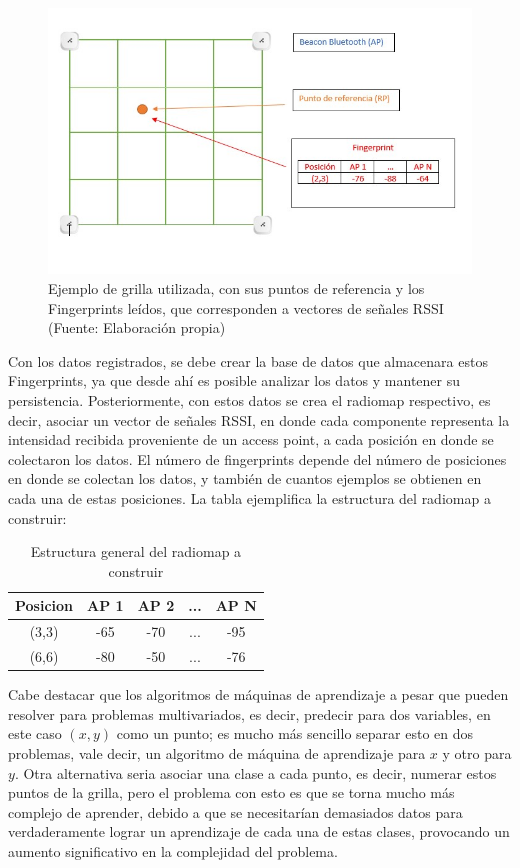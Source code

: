 \begin{figure}[ht!]
\centering
\includegraphics[width=.6\textwidth]{figures/fingerprints.jpg}
\caption[Ejemplo grilla Fingerprint]{Ejemplo de grilla utilizada, con sus puntos de referencia y los Fingerprints leídos, que corresponden a vectores de señales RSSI\\
{\scriptsize (Fuente: Elaboración propia)}}
\label{fig:fingerprints}
\end{figure}

Con los datos registrados, se debe crear la base de datos que almacenara estos Fingerprints, ya que desde ahí es posible analizar los datos y mantener su persistencia. Posteriormente, con estos datos se crea el radiomap respectivo, es decir, asociar un vector de señales RSSI, en donde cada componente representa la intensidad recibida proveniente de un access point, a cada posición en donde se colectaron los datos. El número de fingerprints depende del número de posiciones en donde se colectan los datos, y también de cuantos ejemplos se obtienen en cada una de estas posiciones. La tabla ejemplifica la estructura del radiomap a construir:

\begin{table}[ht!]
\centering
\caption{Estructura general del radiomap a construir}
\label{my-label}
\begin{tabular}{|c|c|c|c|c|}
\hline
Posicion & AP 1 & AP 2 & ... & AP N \\ \hline
(3,3)    & -65  & -70  & ... & -95  \\ \hline
(6,6)    & -80  & -50  & ... & -76  \\ \hline
\end{tabular}
\end{table}

Cabe destacar que los algoritmos de máquinas de aprendizaje a pesar que pueden resolver para problemas multivariados, es decir, predecir para dos variables, en este caso $(x,y)$ como un punto; es mucho más sencillo separar esto en dos problemas, vale decir, un algoritmo de máquina de aprendizaje para $x$ y otro para $y$. Otra alternativa seria asociar una clase a cada punto, es decir, numerar estos puntos de la grilla, pero el problema con esto es que se torna mucho más complejo de aprender, debido a que se necesitarían demasiados datos para verdaderamente lograr un aprendizaje de cada una de estas clases, provocando un aumento significativo en la complejidad del problema.

